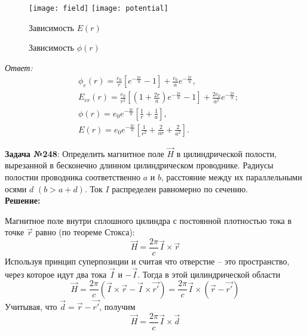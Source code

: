     \begin{figure}[h!]
        \center
        \texttt{[image: field]}\hfill
        \texttt{[image: potential]}
        \parbox{.47\textwidth}{\centering Зависимость \( E(r) \)}\hfill
        \parbox{.47\textwidth}{\centering Зависимость \( \phi(r) \)}
    \end{figure}

\vspace*{2em}        
\emph{Ответ:}
    \begin{align*}
        & \phi_e(r) = \frac{e_0}{r}\left[e^{-\frac{2r}{a}} - 1\right] +
        \frac{e_0}{a}e^{-\frac{2r}{a}}, \\
        & E_{er}(r) = \frac{e_0}{r^2}\left[\left(1 + \frac{2r}{a}\right)
        e^{-\frac{2r}{a}} - 1\right] + \frac{2e_0}{a^2}e^{-\frac{2r}{a}}; \\
        & \phi(r) = e_0e^{-\frac{2r}{a}}\left[\frac{1}{r} + \frac{1}{a}\right], \\
        & E(r) = e_0e^{-\frac{2r}{a}}\left[\frac{1}{r^2} + \frac{2}{ar} +
        \frac{2}{a^2}\right].
    \end{align*}
\newpage


\par\textbf{Задача №248}:  Определить магнитное поле \( \vec{H} \) 
в цилиндрической полости, вырезанной в бесконечно длинном цилиндрическом 
проводнике. Радиусы полостии проводника соответственно \( a \) и \( b \), 
расстояние между их параллельными осями \( d \) \( ( b > a + d) \). 
Ток \( I \) распределен равномерно по сечению. \\

\textbf{Решение:}
\par Магнитное поле внутри сплошного цилиндра с постоянной плотностью тока в точке
\( \vec{r} \) равно (по теореме Стокса): \\
\[ \vec{H} = \frac{2\pi}{c}\vec{I}\times\vec{r}\]
Используя принцип суперпозиции и считая что отверстие -- это пространство,
через которое идут два тока \( \vec{I} \) и \( -\vec{I} \). Тогда в этой
цилиндрической области 
\[ 
    \vec{H} = \frac{2\pi}{c}(\vec{I}\times\vec{r} - \vec{I}\times\vec{r'}) =
    \frac{2\pi}{c}\vec{I}\times(\vec{r}-\vec{r'})
\]
Учитывая, что \( \vec{d}=\vec{r}-\vec{r'} \), получим
\[ \vec{H} = \frac{2\pi}{c}\vec{I}\times\vec{d} \]
\newpage


